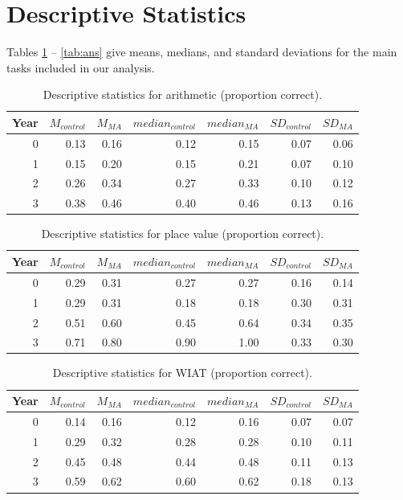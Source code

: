 \documentclass[11pt]{article}
\begin{document}
\section{Descriptive Statistics}

Tables \ref{tab:arith} -- \ref{tab:ans} give means, medians, and standard deviations for the main tasks included in our analysis. 

\begin{table}[H]
\centering
\begin{tabular}{rrrrrrr}
  \hline
Year & $M_{control}$ & $M_{MA}$ & $median_{control}$ & $median_{MA}$ & $SD_{control}$ & $SD_{MA}$ \\ 
  \hline
  0 & 0.13 & 0.16 & 0.12 & 0.15 & 0.07 & 0.06 \\ 
    1 & 0.15 & 0.20 & 0.15 & 0.21 & 0.07 & 0.10 \\ 
    2 & 0.26 & 0.34 & 0.27 & 0.33 & 0.10 & 0.12 \\ 
    3 & 0.38 & 0.46 & 0.40 & 0.46 & 0.13 & 0.16 \\ 
   \hline
\end{tabular}
\caption{Descriptive statistics for arithmetic (proportion correct).} 
\label{tab:arith}
\end{table}
\begin{table}[H]
\centering
\begin{tabular}{rrrrrrr}
  \hline
Year & $M_{control}$ & $M_{MA}$ & $median_{control}$ & $median_{MA}$ & $SD_{control}$ & $SD_{MA}$ \\ 
  \hline
  0 & 0.29 & 0.31 & 0.27 & 0.27 & 0.16 & 0.14 \\ 
    1 & 0.29 & 0.31 & 0.18 & 0.18 & 0.30 & 0.31 \\ 
    2 & 0.51 & 0.60 & 0.45 & 0.64 & 0.34 & 0.35 \\ 
    3 & 0.71 & 0.80 & 0.90 & 1.00 & 0.33 & 0.30 \\ 
   \hline
\end{tabular}
\caption{Descriptive statistics for place value (proportion correct).} 
\label{tab:placeval}
\end{table}

\begin{table}[ht]
\centering
\begin{tabular}{rrrrrrr}
  \hline
Year & $M_{control}$ & $M_{MA}$ & $median_{control}$ & $median_{MA}$ & $SD_{control}$ & $SD_{MA}$ \\ 
  \hline
  0 & 0.14 & 0.16 & 0.12 & 0.16 & 0.07 & 0.07 \\ 
    1 & 0.29 & 0.32 & 0.28 & 0.28 & 0.10 & 0.11 \\ 
    2 & 0.45 & 0.48 & 0.44 & 0.48 & 0.11 & 0.13 \\ 
    3 & 0.59 & 0.62 & 0.60 & 0.62 & 0.18 & 0.13 \\ 
   \hline
\end{tabular}
\caption{Descriptive statistics for WIAT (proportion correct).} 
\label{tab:wiat}
\end{table}
\end{document}
